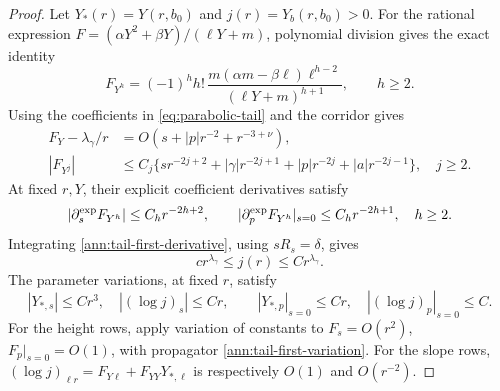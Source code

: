 \begin{proof}
Let \(Y_*(r)=Y(r,b_0)\) and \(j(r)=Y_b(r,b_0)>0\).
For the rational expression \(F=(\alpha Y^2+\beta Y)/(\ell Y+m)\),
polynomial division gives the exact identity
\begin{equation}\label{tail:rational-division}
 F_{Y^h}=(-1)^h h!\,
 \frac{m(\alpha m-\beta\ell)\ell^{h-2}}
      {(\ell Y+m)^{h+1}},\qquad h\ge2.
\end{equation}
Using the coefficients in \eqref{eq:parabolic-tail} and the corridor gives
\begin{align}
 F_Y-\lambda_\gamma/r
   &=O(s+|p|r^{-2}+r^{-3+\nu}),\label{ann:tail-first-derivative}\\
 |F_{Y^j}|&\le C_j\{sr^{-2j+2}+|\gamma|r^{-2j+1}
                    +|p|r^{-2j}+|a|r^{-2j-1}\},\quad j\ge2.
 \label{ann:tail-higher-derivatives}
\end{align}
At fixed \(r,Y\), their explicit coefficient derivatives satisfy
\begin{equation}\label{tail:rational-parameter-bounds}
 |\partial_s^{\rm exp}F_{Y^h}|\le C_hr^{-2h+2},\qquad
 |\partial_p^{\rm exp}F_{Y^h}|_{s=0}\le C_hr^{-2h+1},\quad h\ge2.
\end{equation}
Integrating \eqref{ann:tail-first-derivative}, using \(sR_s=\delta\), gives
\begin{equation}\label{ann:tail-first-variation}
 c r^{\lambda_\gamma}\le j(r)\le C r^{\lambda_\gamma}.
\end{equation}
The parameter variations, at fixed \(r\), satisfy
\begin{equation}\label{eq:tail-parameter-variations}
 |Y_{*,s}|\le Cr^3,\quad |(\log j)_s|\le Cr,\qquad
 |Y_{*,p}|_{s=0}\le Cr,\quad |(\log j)_p|_{s=0}\le C .
\end{equation}
For the height rows, apply variation of constants to
\(F_s=O(r^2)\), \(F_p|_{s=0}=O(1)\), with propagator
\eqref{ann:tail-first-variation}. For the slope rows,
\((\log j)_{\ell r}=F_{Y\ell}+F_{YY}Y_{*,\ell}\) is respectively
\(O(1)\) and \(O(r^{-2})\).


\end{proof}
